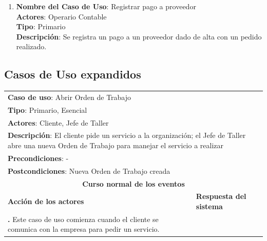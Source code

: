 \documentclass[12pt]{extarticle}
\begin{document}
\begin{spacing}{1.2}
\begin{enumerate}
        \item 	\textbf{Nombre del Caso de Uso}: Registrar pago a proveedor\\
                \textbf{Actores}: Operario Contable\\
                \textbf{Tipo}: Primario\\
                \textbf{Descripción}: Se registra un pago a un proveedor dado de alta con un pedido realizado.
    \end{enumerate}
    \clearpage














    

    \subsection{Casos de Uso expandidos}

    \newcommand\inc{\stepcounter{step}\textbf{\thestep. }}
    \newcommand\resetinc{\setcounter{step}{0}}
    
    \newcommand\raya{\noindent\rule{169mm}{0.8mm}\\}

    \begin{longtable}{ |p{8cm}|p{8cm}| }
        \hline
        \multicolumn{2}{|p{16cm}|}{\textbf{Caso de uso}: Abrir Orden de Trabajo}\\
        \multicolumn{2}{|p{16cm}|}{\textbf{Tipo}: Primario, Esencial}\\
        \multicolumn{2}{|p{16cm}|}{\textbf{Actores}: Cliente, Jefe de Taller}\\
        \multicolumn{2}{|p{16cm}|}{\textbf{Descripción}: El cliente pide un servicio a la organización; el Jefe de Taller abre una nueva Orden de Trabajo para manejar el servicio a realizar}\\
        \multicolumn{2}{|p{16cm}|}{\textbf{Precondiciones}: -}\\
        \multicolumn{2}{|p{16cm}|}{\textbf{Postcondiciones}: Nueva Orden de Trabajo creada}\\
        \hline
        \multicolumn{2}{|c|}{\textbf{Curso normal de los eventos}}\\
        \hline
        \textbf{Acción de los actores} & \textbf{Respuesta del sistema}\\
        \hline
            \inc Este caso de uso comienza cuando el cliente se comunica con la empresa para pedir un servicio. & \\
            \hline


\end{longtable}
\end{spacing}
\end{document}
